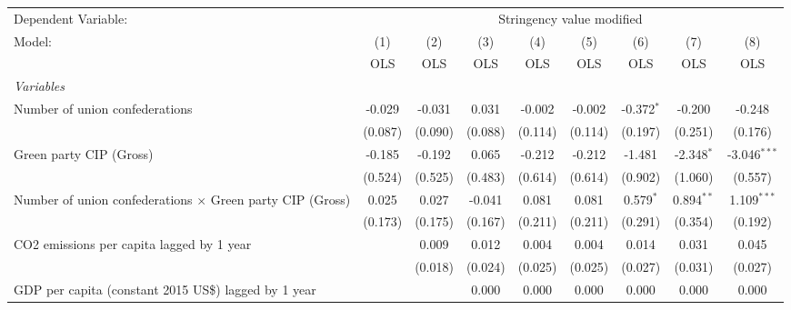 
\begingroup
\centering
\begin{tabular}{lcccccccc}
   \toprule
   Dependent Variable: & \multicolumn{8}{c}{Stringency value modified}\\
   Model:                                                           & (1)     & (2)     & (3)     & (4)           & (5)           & (6)          & (7)          & (8)\\  
                                                                    &  OLS    & OLS     & OLS     & OLS           & OLS           & OLS          & OLS          & OLS\\  
   \midrule
   \emph{Variables}\\
   Number of union confederations                                   & -0.029  & -0.031  & 0.031   & -0.002        & -0.002        & -0.372$^{*}$ & -0.200       & -0.248\\   
                                                                    & (0.087) & (0.090) & (0.088) & (0.114)       & (0.114)       & (0.197)      & (0.251)      & (0.176)\\   
   Green party CIP (Gross)                                          & -0.185  & -0.192  & 0.065   & -0.212        & -0.212        & -1.481       & -2.348$^{*}$ & -3.046$^{***}$\\   
                                                                    & (0.524) & (0.525) & (0.483) & (0.614)       & (0.614)       & (0.902)      & (1.060)      & (0.557)\\   
   Number of union confederations $\times$ Green party CIP (Gross)  & 0.025   & 0.027   & -0.041  & 0.081         & 0.081         & 0.579$^{*}$  & 0.894$^{**}$ & 1.109$^{***}$\\   
                                                                    & (0.173) & (0.175) & (0.167) & (0.211)       & (0.211)       & (0.291)      & (0.354)      & (0.192)\\   
   CO2 emissions per capita lagged by 1 year                        &         & 0.009   & 0.012   & 0.004         & 0.004         & 0.014        & 0.031        & 0.045\\   
                                                                    &         & (0.018) & (0.024) & (0.025)       & (0.025)       & (0.027)      & (0.031)      & (0.027)\\   
   GDP per capita (constant 2015 US\$) lagged by 1 year             &         &         & 0.000   & 0.000         & 0.000         & 0.000        & 0.000        & 0.000\\   

\end{tabular}
